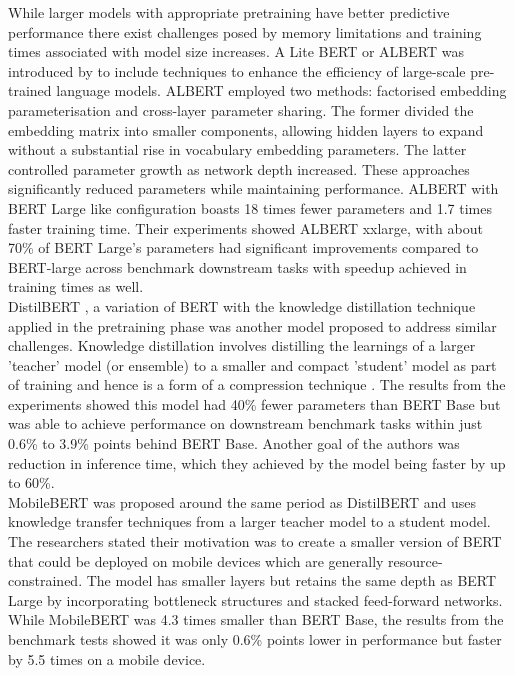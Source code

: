 While larger models with appropriate pretraining have better predictive performance \cite{devlinBERTPretrainingDeep2018, liuRoBERTaRobustlyOptimized2019} there exist challenges posed by memory limitations and training times associated with model size increases. A Lite BERT or ALBERT was introduced by \cite{lanALBERTLiteBERT2020} to include techniques to enhance the efficiency of large-scale pre-trained language models. ALBERT employed two methods: factorised embedding parameterisation and cross-layer parameter sharing. The former divided the embedding matrix into smaller components, allowing hidden layers to expand without a substantial rise in vocabulary embedding parameters. The latter controlled parameter growth as network depth increased. These approaches significantly reduced parameters while maintaining performance. ALBERT with BERT Large like configuration boasts 18 times fewer parameters and 1.7 times faster training time. Their experiments showed ALBERT xxlarge, with about 70\% of BERT Large's parameters had significant improvements compared to BERT-large across benchmark downstream tasks with speedup achieved in training times as well.\\

DistilBERT \cite{sanhDistilBERTDistilledVersion2020}, a variation of BERT with the knowledge distillation technique applied in the pretraining phase was another model proposed to address similar challenges. Knowledge distillation involves distilling the learnings of a larger 'teacher' model (or ensemble) to a smaller and compact 'student' model as part of training and hence is a form of a compression technique \cite{sanhDistilBERTDistilledVersion2020}. The results from the experiments showed this model had 40\% fewer parameters than BERT Base but was able to achieve performance on downstream benchmark tasks within just 0.6\% to 3.9\% points behind BERT Base. Another goal of the authors was reduction in inference time, which they achieved by the model being faster by up to 60\%.\\

MobileBERT \cite{sunMobileBERTCompactTaskAgnostic2020} was proposed around the same period as DistilBERT and uses knowledge transfer techniques from a larger teacher model to a student model. The researchers stated their motivation was to create a smaller version of BERT that could be deployed on mobile devices which are generally resource-constrained. The model has smaller layers but retains the same depth as BERT Large by incorporating  bottleneck structures and stacked feed-forward networks. While MobileBERT was 4.3 times smaller than BERT Base, the results from the benchmark tests showed it was only 0.6\% points lower in performance but faster by 5.5 times on a mobile device.\\

